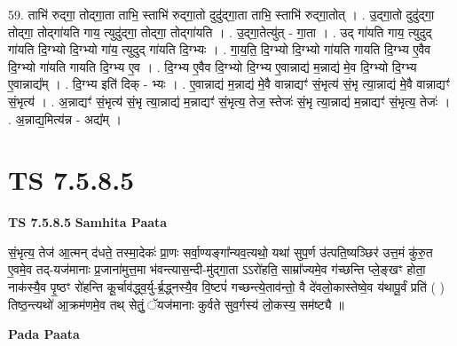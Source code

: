 \documentclass[17pt]{extarticle}
\begin{document}
59. ताभि॑ रुद्‍गा॒ तोद्‍गा॒ता ताभि॒ स्ताभि॑ रुद्‍गा॒तो दुदु॑द्‍गा॒ता ताभि॒ स्ताभि॑ रुद्‍गा॒तोत् । . उ॒द्‍गा॒तो दुदु॑द्‍गा॒ तोद्‍गा॒ तोद्‍गा॑यति गाय॒ त्युदु॑द्‍गा॒ तोद्‍गा॒ तोद्‍गा॑यति । . उ॒द्‍गा॒तेत्यु॑त् - गा॒ता । . उद् गा॑यति गाय॒ त्युदुद् गा॑यति दि॒ग्भ्यो दि॒ग्भ्यो गा॑य॒ त्युदुद् गा॑यति दि॒ग्भ्यः । . गा॒य॒ति॒ दि॒ग्भ्यो दि॒ग्भ्यो गा॑यति गायति दि॒ग्भ्य ए॒वैव दि॒ग्भ्यो गा॑यति गायति दि॒ग्भ्य ए॒व । . दि॒ग्भ्य ए॒वैव दि॒ग्भ्यो दि॒ग्भ्य ए॒वान्नाद्य॑ म॒न्नाद्य॑ मे॒व दि॒ग्भ्यो दि॒ग्भ्य ए॒वान्नाद्य᳚म् । . दि॒ग्भ्य इति॑ दिक् - भ्यः । . ए॒वान्नाद्य॑ म॒न्नाद्य॑ मे॒वै वान्नाद्यꣳ॑ सं॒भृत्य॑ सं॒भृ त्या॒न्नाद्य॑ मे॒वै वान्नाद्यꣳ॑ सं॒भृत्य॑ । . अ॒न्नाद्यꣳ॑ सं॒भृत्य॑ सं॒भृ त्या॒न्नाद्य॑ म॒न्नाद्यꣳ॑ सं॒भृत्य॒ तेज॒ स्तेजः॑ सं॒भृ त्या॒न्नाद्य॑ म॒न्नाद्यꣳ॑ सं॒भृत्य॒ तेजः॑ । . अ॒न्नाद्य॒मित्य॑न्न - अद्य᳚म् । \newline
\pagebreak
{}

\section{ TS 7.5.8.5 }

\textbf{TS 7.5.8.5 } \newline
\textbf{Samhita Paata} \newline

सं॒भृत्य॒ तेज॑ आ॒त्मन् द॑धते॒ तस्मा॒देकः॑ प्रा॒णः सर्वा॒ण्यङ्गा᳚न्यव॒त्यथो॒ यथा॑ सुप॒र्ण उ॑त्पति॒ष्यञ्छिर॑ उत्त॒मं कु॑रु॒त ए॒वमे॒व तद्-यज॑मानाः प्र॒जाना॑मुत्त॒मा भ॑वन्त्यास॒न्दी-मु॑द्गा॒ता ऽऽरो॑हति॒ साम्रा᳚ज्यमे॒व ग॑च्छन्ति प्ले॒ङ्खꣳ होता॒ नाक॑स्यै॒व पृ॒ष्ठꣳ रो॑हन्ति कू॒र्चाव॑द्ध्व॒र्यु-र्ब्र॒द्ध्नस्यै॒व वि॒ष्टपं॑ गच्छन्त्ये॒ताव॑न्तो॒ वै दे॑वलो॒कास्तेष्वे॒व य॑थापू॒र्वं प्रति॑ ( ) तिष्ठ॒न्त्यथो॑ आ॒क्रम॑णमे॒व तथ् सेतुं॒ ॅयज॑मानाः कुर्वते सुव॒र्गस्य॑ लो॒कस्य॒ सम॑ष्ट्यै ॥ \newline

\textbf{Pada Paata} \newline
\end{document}

